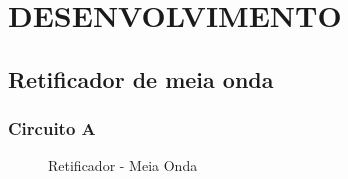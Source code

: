 \chapter{DESENVOLVIMENTO}

\section{Retificador de meia onda}

\subsection{Circuito A}

\begin{figure}[H]
    \centering
    \caption{Retificador - Meia Onda}
    \vspace{-0.3cm}
    \label{fig:ImagemSlide01}
\end{figure}

